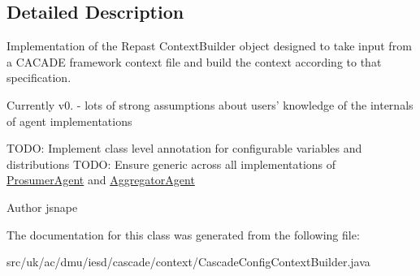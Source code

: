 \subsection{Detailed Description}
Implementation of the Repast Context\-Builder object designed to take input from a C\-A\-C\-A\-D\-E framework context file and build the context according to that specification. 

Currently v0. -\/ lots of strong assumptions about users' knowledge of the internals of agent implementations

T\-O\-D\-O\-: Implement class level annotation for configurable variables and distributions T\-O\-D\-O\-: Ensure generic across all implementations of \hyperlink{}{Prosumer\-Agent} and \hyperlink{}{Aggregator\-Agent}

\begin{DoxyAuthor}{Author}
jsnape 
\end{DoxyAuthor}


The documentation for this class was generated from the following file\-:\begin{DoxyCompactItemize}
\item 
src/uk/ac/dmu/iesd/cascade/context/Cascade\-Config\-Context\-Builder.\-java\end{DoxyCompactItemize}
